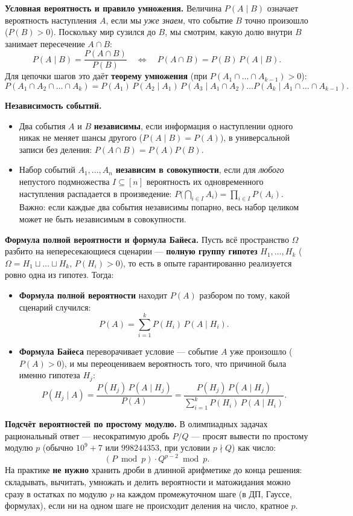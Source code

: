 \documentclass[10pt,a4paper]{article}
\begin{document}
\textbf{Условная вероятность и правило умножения.} Величина $P(A \mid B)$ означает вероятность наступления $A$, если мы \emph{уже знаем}, что событие $B$ точно произошло ($P(B) > 0$). Поскольку мир сузился до $B$, мы смотрим, какую долю внутри $B$ занимает пересечение $A \cap B$:
\[
  P(A \mid B) = \frac{P(A \cap B)}{P(B)} \quad \Longleftrightarrow \quad P(A \cap B) = P(B)\, P(A \mid B).
\]
Для цепочки шагов это даёт \textbf{теорему умножения} (при $P(A_1 \cap \dots \cap A_{k-1}) > 0$):
\[
  P(A_1 \cap A_2 \cap \dots \cap A_k) = P(A_1)\, P(A_2 \mid A_1)\, P(A_3 \mid A_1 \cap A_2) \dots P(A_k \mid A_1 \cap \dots \cap A_{k-1}).
\]

\textbf{Независимость событий.}
\begin{itemize}
  \item Два события $A$ и $B$ \textbf{независимы}, если информация о наступлении одного никак не меняет шансы другого ($P(A \mid B) = P(A)$), в универсальной записи без деления: $P(A \cap B) = P(A) P(B)$.
  \item Набор событий $A_1, \dots, A_n$ \textbf{независим в совокупности}, если для \emph{любого} непустого подмножества $I \subseteq [n]$ вероятность их одновременного наступления распадается в произведение: $P\bigl(\bigcap_{i \in I} A_i\bigr) = \prod_{i \in I} P(A_i)$. Важно: если каждые два события независимы попарно, весь набор целиком может не быть независимым в совокупности.
\end{itemize}

\textbf{Формула полной вероятности и формула Байеса.} Пусть всё пространство $\Omega$ разбито на непересекающиеся сценарии — \textbf{полную группу гипотез} $H_1, \dots, H_k$ ($\Omega = H_1 \sqcup \dots \sqcup H_k$, $P(H_i) > 0$), то есть в опыте гарантированно реализуется ровно одна из гипотез. Тогда:
\begin{itemize}
  \item \textbf{Формула полной вероятности} находит $P(A)$ разбором по тому, какой сценарий случился:
  \[
    P(A) = \sum_{i=1}^{k} P(H_i)\, P(A \mid H_i).
  \]
  \item \textbf{Формула Байеса} переворачивает условие — событие $A$ уже произошло ($P(A) > 0$), и мы переоцениваем вероятность того, что причиной была именно гипотеза $H_j$:
  \[
    P(H_j \mid A) = \frac{P(H_j)\, P(A \mid H_j)}{P(A)} = \frac{P(H_j)\, P(A \mid H_j)}{\sum_{i=1}^{k} P(H_i)\, P(A \mid H_i)}.
  \]
\end{itemize}

\textbf{Подсчёт вероятностей по простому модулю.} В олимпиадных задачах рациональный ответ — несократимую дробь $P / Q$ — просят вывести по простому модулю $p$ (обычно $10^9 + 7$ или $998244353$, при условии $p \nmid Q$) как число:
\[
  (P \bmod p) \cdot Q^{p-2} \bmod p.
\]
На практике \textbf{не нужно} хранить дроби в длинной арифметике до конца решения: складывать, вычитать, умножать и делить вероятности и матожидания можно сразу в остатках по модулю $p$ на каждом промежуточном шаге (в ДП, Гауссе, формулах), если ни на одном шаге не происходит деления на число, кратное $p$.
\end{document}
